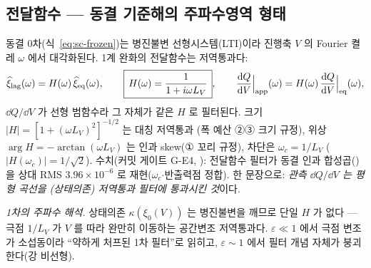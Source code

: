 \subsection{전달함수 --- 동결 기준해의 주파수영역 형태}\label{sec:sc-transfer}
동결 0차(식~\eqref{eq:sc-frozen})는 병진불변 선형시스템(LTI)이라 진행축 $V$ 의 Fourier 켤레 $\omega$ 에서 대각화된다.
1계 완화의 전달함수는 저역통과다:
\begin{equation}
\widehat{\xi}_{\mathrm{lag}}(\omega)=H(\omega)\,\widehat{\xi}_{\mathrm{eq}}(\omega),\qquad
\boxed{\,H(\omega)=\frac1{1+i\omega L_V}\,},\qquad
\frac{\mathrm{d} Q}{\mathrm{d} V}\Big|_{\mathrm{app}}(\omega)=H(\omega)\,\frac{\mathrm{d} Q}{\mathrm{d} V}\Big|_{\mathrm{eq}}(\omega),
\label{eq:sc-transfer}
\end{equation}
$\dd Q/\dd V$ 가 선형 범함수라 그 자체가 같은 $H$ 로 필터된다. 크기 $|H|=[1+(\omega L_V)^2]^{-1/2}$ 는 대칭 저역통과
(폭 예산 ②③ 크기 규정), 위상 $\arg H=-\arctan(\omega L_V)$ 는 인과 skew(① 꼬리 규정), 차단은 $\omega_c=1/L_V$
($|H(\omega_c)|=1/\sqrt2$). 수치(커밋 게이트 G-E4, ): 전달함수 필터가 동결
인과 합성곱()을 상대 RMS $3.96\times10^{-6}$ 로 재현($\omega_c$$\cdot$반출력점 정합).
한 문장으로: \emph{관측 $\dd Q/\dd V$ 는 평형 곡선을 (상태의존) 저역통과 필터에 통과시킨 것}이다.

\emph{1차의 주파수 해석.} 상태의존 $\kappa(\xi_0(V))$ 는 병진불변을 깨므로 단일 $H$ 가 없다 --- 극점 $1/L_V$ 가
$V$ 를 따라 완만히 이동하는 공간변조 저역통과다. $\varepsilon\ll1$ 에서 극점 변조가 소섭동이라 ``약하게 처프된 1차
필터''로 읽히고, $\varepsilon\sim1$ 에서 필터 개념 자체가 붕괴한다(강 비선형).

